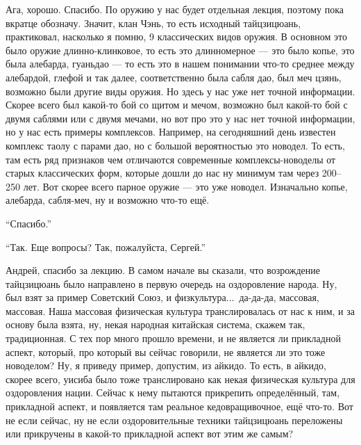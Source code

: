 Ага, хорошо. Спасибо. По 
оружию у нас будет отдельная лекция, поэтому пока вкратце обозначу. Значит, клан Чэнь, то 
есть исходный тайцзицюань, практиковал, насколько я помню, 9 классических видов оружия. 
В основном это было оружие длинно-клинковое, то есть это длинномерное --- это было 
копье, это была алебарда, гуаньдао --- то есть это в нашем понимании что-то 
среднее между алебардой, глефой и так далее, соответственно была 
сабля дао, был меч цзянь, возможно были другие виды оружия. Но здесь у нас уже нет точной 
информации. Скорее всего был какой-то бой со щитом и мечом, возможно был какой-то бой с двумя 
саблями или с двумя мечами, но вот про это у нас нет точной информации, но у нас есть 
примеры комплексов. Например, на сегодняшний день известен комплекс таолу с парами дао, но с 
большой вероятностью это новодел. То есть, там есть ряд признаков чем отличаются современные 
комплексы-новоделы от старых классических форм, которые дошли до нас ну минимум там через
200--250 лет. 
Вот скорее всего парное оружие --- это уже новодел. Изначально копье, алебарда, сабля-меч, ну и 
возможно что-то ещё.

``Спасибо.''

``Так. Еще вопросы? Так, пожалуйста, Сергей.''

Андрей, спасибо за лекцию. В самом начале вы сказали, что возрождение тайцзицюань было 
направлено в первую очередь на оздоровление народа. Ну, был взят за пример Советский Союз, и 
физкультура...\ да-да-да, массовая, массовая. Наша массовая физическая культура 
транслировалась от нас к ним, и за основу была взята, ну, некая народная китайская система, 
скажем так, традиционная. С тех пор много прошло времени, и не является ли прикладной 
аспект, который, про который вы сейчас говорили, не является ли это тоже новоделом? Ну, я 
приведу пример, допустим, из айкидо. То есть, в айкидо, скорее всего, уисиба было тоже 
транслировано как некая физическая культура для оздоровления нации. Сейчас к нему пытаются 
прикрепить определённый, там, прикладной аспект, и появляется там реальное кедовращивочное,
ещё что-то. Вот не если сейчас, ну не если оздоровительные техники тайцзицюань переложены или 
прикручены в какой-то прикладной аспект вот этим же самым?

